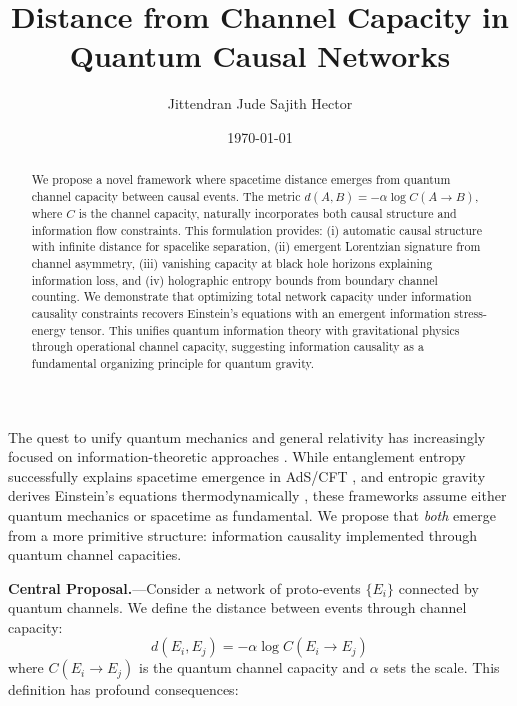 \documentclass[aps,prl,twocolumn,showpacs,superscriptaddress,groupedaddress]{revtex4-2}
\begin{document}
\title{Distance from Channel Capacity in Quantum Causal Networks}

\author{Jittendran Jude Sajith Hector}

\date{\today}

\begin{abstract}
We propose a novel framework where spacetime distance emerges from quantum channel capacity between causal events. The metric $d(A,B) = -\alpha \log C(A \to B)$, where $C$ is the channel capacity, naturally incorporates both causal structure and information flow constraints. This formulation provides: (i) automatic causal structure with infinite distance for spacelike separation, (ii) emergent Lorentzian signature from channel asymmetry, (iii) vanishing capacity at black hole horizons explaining information loss, and (iv) holographic entropy bounds from boundary channel counting. We demonstrate that optimizing total network capacity under information causality constraints recovers Einstein's equations with an emergent information stress-energy tensor. This unifies quantum information theory with gravitational physics through operational channel capacity, suggesting information causality as a fundamental organizing principle for quantum gravity.
\end{abstract}


\maketitle

The quest to unify quantum mechanics and general relativity has increasingly focused on information-theoretic approaches \cite{VanRaamsdonk2010,Swingle2012}. While entanglement entropy successfully explains spacetime emergence in AdS/CFT \cite{Ryu2006}, and entropic gravity derives Einstein's equations thermodynamically \cite{Verlinde2011,Jacobson1995}, these frameworks assume either quantum mechanics or spacetime as fundamental. We propose that \textit{both} emerge from a more primitive structure: information causality implemented through quantum channel capacities.

\textbf{Central Proposal.}---Consider a network of proto-events $\{E_i\}$ connected by quantum channels. We define the distance between events through channel capacity:
\begin{equation}
d(E_i, E_j) = -\alpha \log C(E_i \to E_j)
\label{eq:distance}
\end{equation}
where $C(E_i \to E_j)$ is the quantum channel capacity and $\alpha$ sets the scale. This definition has profound consequences:
\end{document}
